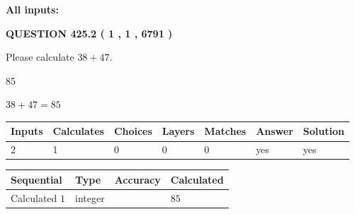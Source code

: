 \documentclass[12pt]{article}
\begin{document}
   
   
   
\noindent{}
   
   
   
   
\noindent\vspace{0.1in}\hspace{-0.08in} {\textbf{\Large{All inputs: }}}
   
   
  
\vspace{0.2in}
  
{\textbf{\Large{QUESTION
425.2 
 ( 1 , 1 , 6791 )
}}}
  
  
 
Please calculate $ %
38 +  %
47 $.
 
 
 
\noindent{}
 
 

85
 
 
\noindent{}
 
 

 
 
 
\noindent{}
 
 

$ %
38 +  %
47=   %
85$
 
 
\noindent{}
 
 

 
   
   
   
   
\noindent\begin{tabular}{|l|l|l|l|l|l|l|}
 \hline
Inputs & Calculates & Choices & Layers & Matches & Answer & Solution \\ \hline
 2  & 
 1  & 
 0
  & 
 0  & 
 0  & 
  yes & 
  yes 
  \\ \hline
 \end{tabular}
   
   
   
   
\noindent{}
   
   
  
  
\noindent\begin{tabular}{|l|l|l|l|}
\hline
 Sequential & Type & Accuracy & Calculated \\ 
\hline
 
 
  Calculated $  1 $ & integer &  & 
  $ 85 $ 
 \\  \hline  
 \end{tabular}
   
\end{document}
